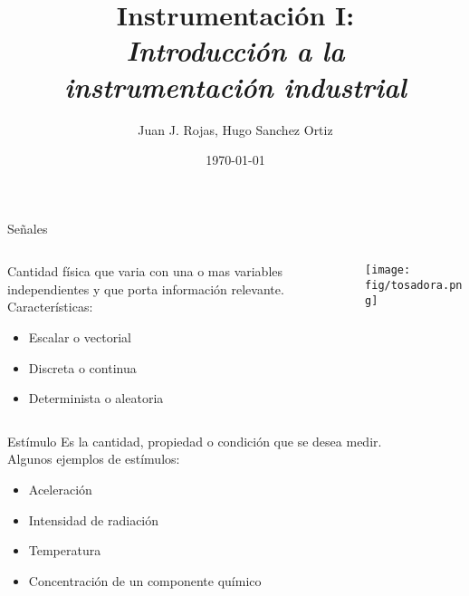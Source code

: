 \documentclass[aspectratio=169]{beamer}
\title{Instrumentación I: \\ \emph{Introducción a la}\\ \emph{instrumentación industrial}}
\author{
    Juan J. Rojas, Hugo Sanchez Ortiz
}
\institute{Instituto Tecnológico de Costa Rica}
\date{\today}
\begin{document}

\maketitle

\newcommand{\blackandwhite}{black} %

\begin{frame}{Señales}
    \begin{columns}[onlytextwidth]
        \begin{column}{0.6\textwidth}
        Cantidad física que varia con una o mas variables independientes y que porta información relevante.\\[8pt]
        Características: 
            \begin{itemize}
                \item Escalar o vectorial 
                \item Discreta o continua
                \item Determinista o aleatoria
            \end{itemize}    
        \end{column}
        \begin{column}{0.4\textwidth}
            \begin{center}
                \texttt{[image: fig/tosadora.png]}
            \end{center}
        \end{column}
    \end{columns}
\end{frame}

\begin{frame}{Estímulo}
Es la cantidad, propiedad o condición que se desea medir.\\[8pt]
Algunos ejemplos de estímulos: 
    \begin{itemize}
        \item Aceleración 
        \item Intensidad de radiación
        \item Temperatura
        \item Concentración de un componente químico
    \end{itemize}    
\end{frame}
\end{document}
